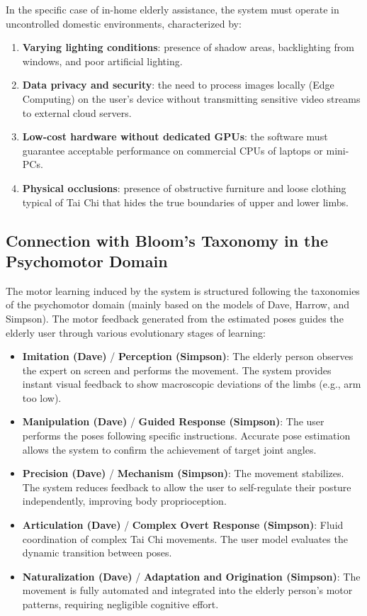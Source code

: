 \documentclass[a4paper,11pt]{article}
\begin{document}
In the specific case of in-home elderly assistance, the system must operate in uncontrolled domestic environments, characterized by:
\begin{enumerate}
    \item \textbf{Varying lighting conditions}: presence of shadow areas, backlighting from windows, and poor artificial lighting.
    \item \textbf{Data privacy and security}: the need to process images locally (Edge Computing) on the user's device without transmitting sensitive video streams to external cloud servers.
    \item \textbf{Low-cost hardware without dedicated GPUs}: the software must guarantee acceptable performance on commercial CPUs of laptops or mini-PCs.
    \item \textbf{Physical occlusions}: presence of obstructive furniture and loose clothing typical of Tai Chi that hides the true boundaries of upper and lower limbs.
\end{enumerate}

\subsection{Connection with Bloom's Taxonomy in the Psychomotor Domain}
The motor learning induced by the system is structured following the taxonomies of the psychomotor domain (mainly based on the models of Dave, Harrow, and Simpson). The motor feedback generated from the estimated poses guides the elderly user through various evolutionary stages of learning:
\begin{itemize}
    \item \textbf{Imitation (Dave)} / \textbf{Perception (Simpson)}: The elderly person observes the expert on screen and performs the movement. The system provides instant visual feedback to show macroscopic deviations of the limbs (e.g., arm too low).
    \item \textbf{Manipulation (Dave)} / \textbf{Guided Response (Simpson)}: The user performs the poses following specific instructions. Accurate pose estimation allows the system to confirm the achievement of target joint angles.
    \item \textbf{Precision (Dave)} / \textbf{Mechanism (Simpson)}: The movement stabilizes. The system reduces feedback to allow the user to self-regulate their posture independently, improving body proprioception.
    \item \textbf{Articulation (Dave)} / \textbf{Complex Overt Response (Simpson)}: Fluid coordination of complex Tai Chi movements. The user model evaluates the dynamic transition between poses.
    \item \textbf{Naturalization (Dave)} / \textbf{Adaptation and Origination (Simpson)}: The movement is fully automated and integrated into the elderly person's motor patterns, requiring negligible cognitive effort.
\end{itemize}
\end{document}
